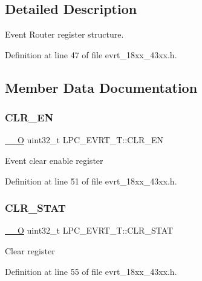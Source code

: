 \subsection{Detailed Description}
Event Router register structure. 

Definition at line 47 of file evrt\+\_\+18xx\+\_\+43xx.\+h.



\subsection{Member Data Documentation}
\mbox{\label{struct_l_p_c___e_v_r_t___t_a07d1f1adf7919c0caa92493c6e41eceb}} 
\subsubsection{\texorpdfstring{C\+L\+R\+\_\+\+EN}{CLR\_EN}}
{\footnotesize\ttfamily \hyperlink{core__sc300_8h_a7e25d9380f9ef903923964322e71f2f6}{\+\_\+\+\_\+O} uint32\+\_\+t L\+P\+C\+\_\+\+E\+V\+R\+T\+\_\+\+T\+::\+C\+L\+R\+\_\+\+EN}

Event clear enable register 

Definition at line 51 of file evrt\+\_\+18xx\+\_\+43xx.\+h.

\mbox{\label{struct_l_p_c___e_v_r_t___t_a3698488eb89a8775f3fabebe71669107}} 
\subsubsection{\texorpdfstring{C\+L\+R\+\_\+\+S\+T\+AT}{CLR\_STAT}}
{\footnotesize\ttfamily \hyperlink{core__sc300_8h_a7e25d9380f9ef903923964322e71f2f6}{\+\_\+\+\_\+O} uint32\+\_\+t L\+P\+C\+\_\+\+E\+V\+R\+T\+\_\+\+T\+::\+C\+L\+R\+\_\+\+S\+T\+AT}

Clear register 

Definition at line 55 of file evrt\+\_\+18xx\+\_\+43xx.\+h.

